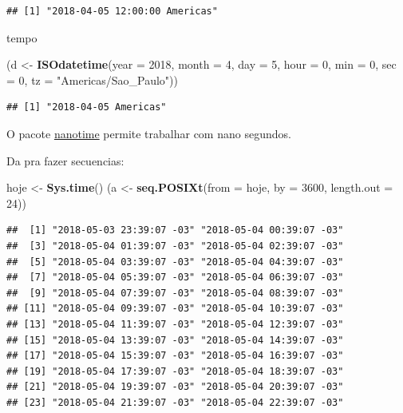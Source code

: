 \documentclass[]{book}
\newenvironment{Shaded}{\begin{snugshade}}{\end{snugshade}}
\newcommand{\KeywordTok}[1]{\textcolor[rgb]{0.13,0.29,0.53}{\textbf{#1}}}
\newcommand{\DataTypeTok}[1]{\textcolor[rgb]{0.13,0.29,0.53}{#1}}
\newcommand{\DecValTok}[1]{\textcolor[rgb]{0.00,0.00,0.81}{#1}}
\newcommand{\StringTok}[1]{\textcolor[rgb]{0.31,0.60,0.02}{#1}}
\newcommand{\NormalTok}[1]{#1}
\begin{document}
\begin{verbatim}
## [1] "2018-04-05 12:00:00 Americas"
\end{verbatim}

tempo

\begin{Shaded}
\begin{Highlighting}[]
\NormalTok{(d <-}\StringTok{ }\KeywordTok{ISOdatetime}\NormalTok{(}\DataTypeTok{year =} \DecValTok{2018}\NormalTok{, }\DataTypeTok{month =} \DecValTok{4}\NormalTok{, }\DataTypeTok{day =} \DecValTok{5}\NormalTok{, }\DataTypeTok{hour =} \DecValTok{0}\NormalTok{, }\DataTypeTok{min =} \DecValTok{0}\NormalTok{, }\DataTypeTok{sec =} \DecValTok{0}\NormalTok{,}
                  \DataTypeTok{tz =} \StringTok{"Americas/Sao_Paulo"}\NormalTok{))}
\end{Highlighting}
\end{Shaded}

\begin{verbatim}
## [1] "2018-04-05 Americas"
\end{verbatim}

O pacote \href{https://github.com/eddelbuettel/nanotime}{nanotime}
permite trabalhar com nano segundos.

Da pra fazer secuencias:

\begin{Shaded}
\begin{Highlighting}[]
\NormalTok{hoje <-}\StringTok{ }\KeywordTok{Sys.time}\NormalTok{()}
\NormalTok{(a <-}\StringTok{ }\KeywordTok{seq.POSIXt}\NormalTok{(}\DataTypeTok{from =}\NormalTok{ hoje, }\DataTypeTok{by =} \DecValTok{3600}\NormalTok{, }\DataTypeTok{length.out =} \DecValTok{24}\NormalTok{))}
\end{Highlighting}
\end{Shaded}

\begin{verbatim}
##  [1] "2018-05-03 23:39:07 -03" "2018-05-04 00:39:07 -03"
##  [3] "2018-05-04 01:39:07 -03" "2018-05-04 02:39:07 -03"
##  [5] "2018-05-04 03:39:07 -03" "2018-05-04 04:39:07 -03"
##  [7] "2018-05-04 05:39:07 -03" "2018-05-04 06:39:07 -03"
##  [9] "2018-05-04 07:39:07 -03" "2018-05-04 08:39:07 -03"
## [11] "2018-05-04 09:39:07 -03" "2018-05-04 10:39:07 -03"
## [13] "2018-05-04 11:39:07 -03" "2018-05-04 12:39:07 -03"
## [15] "2018-05-04 13:39:07 -03" "2018-05-04 14:39:07 -03"
## [17] "2018-05-04 15:39:07 -03" "2018-05-04 16:39:07 -03"
## [19] "2018-05-04 17:39:07 -03" "2018-05-04 18:39:07 -03"
## [21] "2018-05-04 19:39:07 -03" "2018-05-04 20:39:07 -03"
## [23] "2018-05-04 21:39:07 -03" "2018-05-04 22:39:07 -03"
\end{verbatim}
\end{document}

